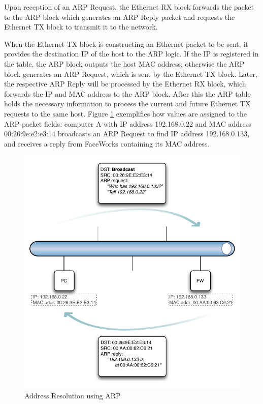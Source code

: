 \documentclass[defaultstyle,10pt,master,Helvetica]{thesis}
\begin{document}
Upon reception of an \ac{ARP} Request, the Ethernet RX block forwards the packet to the ARP block which generates an \ac{ARP} Reply packet and requests the Ethernet TX block to transmit it to the network.

When the Ethernet TX block is constructing an Ethernet packet to be sent, it provides the destination \ac{IP} of the host to the \ac{ARP} logic. If the \ac{IP} is registered in the table, the ARP block outputs the host \ac{MAC} address; otherwise the \ac{ARP} block generates an \ac{ARP} Request, which is sent by the Ethernet TX block. Later, the respective \ac{ARP} Reply will be processed by the Ethernet RX block, which forwards the \ac{IP} and \ac{MAC} address to the \ac{ARP} block. After this the \ac{ARP} table holds the necessary information to process the current and future Ethernet TX requests to the same host.
\clearpage
Figure \ref{fig:Arp-example} exemplifies how values are assigned to the \ac{ARP} packet fields: computer A with \ac{IP} address 192.168.0.22 and \ac{MAC} address 00:26:9e:e2:e3:14 broadcasts an \ac{ARP} Request to find \ac{IP} address 192.168.0.133, and receives a reply from FaceWorks containing its \ac{MAC} address.

\begin{figure}[h]
  \centering
      \includegraphics[scale=0.75,center]{Diagrams/ARP-example.pdf}
  \caption{Address Resolution using \ac{ARP}}\label{fig:Arp-example}
\end{figure}
\end{document}
